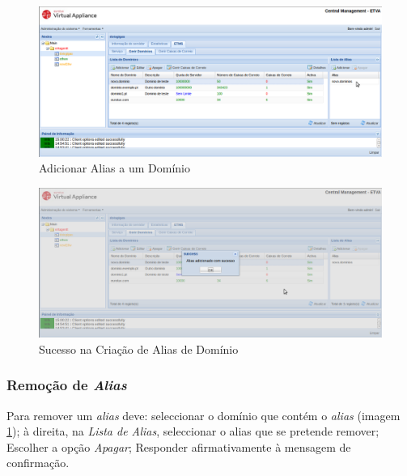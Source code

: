 \begin{figure}[H]
    \begin{center}
    \includegraphics[scale=0.35]{screenshots/etms/etms_criar_alias_dominio.png}
    \caption{Adicionar Alias a um Domínio}
    \label{fig:etms_criar_alias_dominio}
    \end{center}
\end{figure}

\begin{figure}[H]
    \begin{center}
    \includegraphics[scale=0.35]{screenshots/etms/etms_criar_alias_dominio_success.png}
    \caption{Sucesso na Criação de Alias de Domínio}
    \label{fig:etms_criar_alias_dominio_success}
    \end{center}
\end{figure}


\subsubsection{Remoção de \textit{Alias}}
\label{sec:etms_sub_remocao_alias_dominio}
Para remover um \textit{alias} deve: seleccionar o domínio que contém o \textit{alias} (imagem \ref{fig:etms_criar_alias_dominio}); à direita, na \textit{Lista de Alias}, seleccionar o alias que se pretende remover; Escolher a opção \textit{Apagar}; Responder afirmativamente à mensagem de confirmação.

